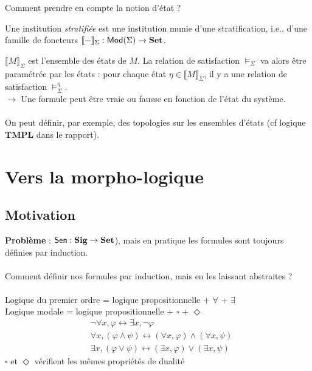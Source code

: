 \documentclass{beamer}
\newcommand{\gr}{\textbf}
\newcommand{\info}[1]{\text{{\fontfamily{lmss}\selectfont #1}}}
\newcommand{\Mod}{\info{Mod}}
\newcommand{\Sen}{\info{Sen}}
\begin{document}
\begin{frame}
Comment prendre en compte la notion d'état ? \pause
\begin{definition}[Stratification]
Une institution \textit{stratifiée} est une institution munie d'une stratification, i.e., d'une famille de foncteurs $\llbracket - \rrbracket_\Sigma : \Mod(\Sigma) \to \gr{Set}$.
\end{definition}
$\llbracket M \rrbracket_\Sigma$ est l'ensemble des états de $M$.
\pause
La relation de satisfaction $\models_\Sigma$ va alors être paramétrée par les états : pour chaque état $\eta \in \llbracket M \rrbracket_\Sigma$, il y a une relation de satisfaction $\models_\Sigma^\eta$.\\
$\longrightarrow$ Une formule peut être vraie ou fausse en fonction de l'état du système. \\~\\
On peut définir, par exemple, des topologies sur les ensembles d'états (cf logique $\textbf{TMPL}$ dans le rapport).
\end{frame}

\section{Vers la morpho-logique}

\subsection{Motivation}
\begin{frame}
\gr{Problème} : $\Sen : \gr{Sig} \to \gr{Set}$), mais en pratique les formules sont toujours définies par induction.\\~\\ \pause
Comment définir nos formules par induction, mais en les laissant abstraites ? \pause \\~\\
Logique du premier ordre = logique propositionnelle + $\forall$ + $\exists$\\
Logique modale = logique propositionnelle + $\square$ + $\Diamond$\\ \pause
\begin{align*}
& \neg \forall x, \varphi \leftrightarrow \exists x, \neg \varphi \\
& \forall x, (\varphi \wedge \psi) \leftrightarrow (\forall x, \varphi) \wedge (\forall x, \psi) \\
& \exists x, (\varphi \vee \psi) \leftrightarrow (\exists x, \varphi) \vee (\exists x, \psi)
\end{align*} \pause
$\square$ et $\Diamond$ vérifient les mêmes propriétés de dualité
\end{frame}
\end{document}
